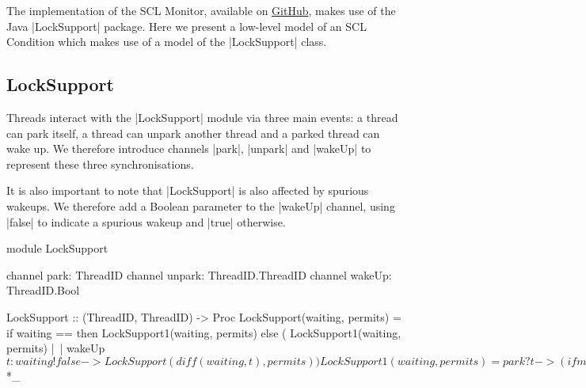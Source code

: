The implementation of the SCL Monitor, available on \href{https://github.com/GavinLowe1967/Scala-Concurrency-Library/blob/main/src/Lock/Lock.scala}{GitHub}, makes use of the Java |LockSupport| package. Here we present a low-level model of an SCL Condition which makes use of a model of the |LockSupport| class.

\subsection{LockSupport}

Threads interact with the |LockSupport| module via three main events: a thread can park itself, a thread can unpark another thread and a parked thread can wake up. We therefore introduce channels |park|, |unpark| and |wakeUp| to represent these three synchronisations. 

It is also important to note that |LockSupport| is also affected by spurious wakeups. We therefore add a Boolean parameter to the |wakeUp| channel, using |false| to indicate a spurious wakeup and |true| otherwise.

\begin{cspm}[caption={The CSP model of the Java LockSupport module}]
  module LockSupport

    channel park: ThreadID
    channel unpark: ThreadID.ThreadID
    channel wakeUp: ThreadID.Bool

    LockSupport :: ({ThreadID}, {ThreadID}) -> Proc
    LockSupport(waiting, permits) =
      if waiting == {} then LockSupport1(waiting, permits)
      else (    LockSupport1(waiting, permits)
            |~| wakeUp$t:waiting!false -> LockSupport(diff(waiting, {t}), permits))

    LockSupport1(waiting, permits) =
      park?t-> (
        if member(t, permits)
          then wakeUp.t.true -> LockSupport(waiting, diff(permits, {t}))
        else LockSupport(union(waiting, {t}), permits) )
      []
      unpark?t?t2-> ( 
        if member(t2, waiting)
          then wakeUp.t2.true -> LockSupport(diff(waiting, {t2}), permits)
        else LockSupport(waiting, union(permits, {t2})))
    

    LockSupportDet :: ({ThreadID}, {ThreadID}) -> Proc
    LockSupportDet(waiting, permits) = LockSupportDet1(waiting, permits)
    LockSupportDet1(waiting, permits) = ... -- Analogous to LockSupport1

  exports

    InitLockSupport = LockSupport({}, {})

    InitLockSupportDet = LockSupportDet({}, {})

    Park(t) = park.t -> wakeUp.t?_ ->  SKIP

    Unpark(t, t') = unpark.t.t' -> SKIP


  endmodule _*$*_
\end{cspm}

